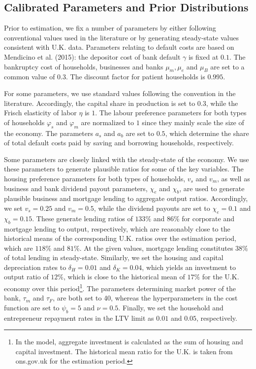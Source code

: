 \documentclass[12pt]{article}
\numberwithin{equation}{section}
\begin{document}
\subsection{Calibrated Parameters and Prior Distributions }

Prior to estimation, we fix a number of parameters by either following conventional values used in the literature or by generating steady-state values consistent with U.K. data. Parameters relating to default costs are based on Mendicino et al. (2015): the depositor cost of bank default $\gamma$ is fixed at $0.1$. The bankruptcy cost of households, businesses and banks $\mu_m, \mu_e$ and $\mu_B$ are set to a common value of $0.3$. The discount factor for patient households is $0.995$. 


For some parameters, we use standard values following the convention in the literature. Accordingly, the capital share in production is set to $0.3$, while the Frisch elasticity of labor $\eta$ is $1$. The labour preference parameters for both types of households $\varphi_s$ and $\varphi_m$ are normalized to $1$ since they mainly scale the size of the economy. The parameters $a_s$ and $a_b$ are set to $0.5$, which determine the share of total default costs paid by saving and borrowing households, respectively. 


Some parameters are closely linked with the steady-state of the economy. We use these parameters to generate plausible ratios for some of the key variables. The housing preference parameters for both types of households, $v_s$ and $v_m$, as well as business and bank dividend payout parameters, $\chi_e$ and $\chi_b$, are used to generate plausible business and mortgage lending to aggregate output ratios.  Accordingly, we set $v_s=0.25$ and $v_m=0.5$, while the dividend payouts are set to $\chi_e=0.1$ and $\chi_b=0.15$. These generate lending ratios of $133 \%$ and $86 \%$ for corporate and mortgage lending to output, respectively, which are reasonably close to the historical means of the corresponding U.K. ratios over the estimation period, which are $118 \%$ and $81 \%$. At the given values, mortgage lending constitutes $38 \%$ of total lending in steady-state. Similarly, we set the housing and capital depreciation rates to $\delta_H=0.01$ and $\delta_K=0.04$, which yields an investment to output ratio of $12 \%$, which is close to the historical mean of $17 \%$ for the U.K. economy over this period\footnote{In the model, aggregate investment is calculated as the sum of housing and capital investment. The historical mean ratio for the U.K. is taken from ons.gov.uk for the estimation period.}. The parameters determining market power of the bank, $\tau_m$ and $\tau_F$, are both set to 40, whereas the hyperparameters in the cost function are set to $\psi_b=5$ and $\nu=0.5$. Finally, we set the household and entrepreneur repayment rates in the LTV limit as $0.01$ and $0.05$, respectively. 
\end{document}
